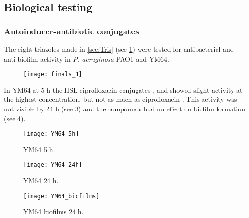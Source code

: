 \subsection{Biological testing\label{sec:bio1}}

\subsubsection{Autoinducer-antibiotic conjugates}

The eight triazoles made in \ref{sec:Tris} (see \ref{fgr:finals_1}) were tested for antibacterial and anti-biofilm activity in \textit{P. aeruginosa} PAO1\cite{Stover2000} and YM64\cite{Morita2001}.

\begin{figure}[H]
	\begin{center}
		\texttt{[image: finals\_1]}
		\caption{
 		\label{fgr:finals_1}}
	\end{center}
\end{figure}


In YM64 at 5 h the HSL-ciprofloxacin conjugates ,  and  showed slight activity at the highest concentration, but not as much as ciprofloxacin .
This activity was not visible by 24 h (see \ref{fgr:YM64_24h}) and the compounds had no effect on biofilm formation (see \ref{fgr:YM64_biofilms}).


\begin{figure}[H]
	\begin{center}
		\texttt{[image: YM64\_5h]}
		\caption{YM64 5 h.\label{fgr:YM64_5h}}
	\end{center}
\end{figure}

\begin{figure}[H]
	\begin{center}
		\texttt{[image: YM64\_24h]}
		\caption{YM64 24 h.\label{fgr:YM64_24h}}
	\end{center}
\end{figure}

\begin{figure}[H]
	\begin{center}
		\texttt{[image: YM64\_biofilms]}
		\caption{YM64 biofilms 24 h.\label{fgr:YM64_biofilms}}
	\end{center}
\end{figure}

